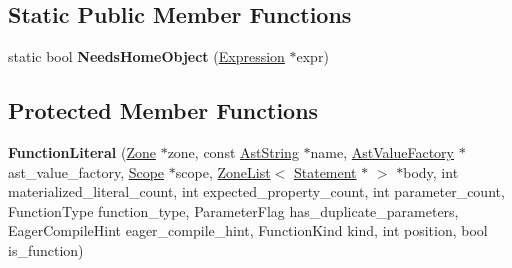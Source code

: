 \subsection*{Static Public Member Functions}
\begin{DoxyCompactItemize}
\item 
static bool {\bfseries Needs\+Home\+Object} (\hyperlink{classv8_1_1internal_1_1_expression}{Expression} $\ast$expr)\hypertarget{classv8_1_1internal_1_1_function_literal_ad78102843077c6fd61438c3709d6d1ba}{}\label{classv8_1_1internal_1_1_function_literal_ad78102843077c6fd61438c3709d6d1ba}

\end{DoxyCompactItemize}
\subsection*{Protected Member Functions}
\begin{DoxyCompactItemize}
\item 
{\bfseries Function\+Literal} (\hyperlink{classv8_1_1internal_1_1_zone}{Zone} $\ast$zone, const \hyperlink{classv8_1_1internal_1_1_ast_string}{Ast\+String} $\ast$name, \hyperlink{classv8_1_1internal_1_1_ast_value_factory}{Ast\+Value\+Factory} $\ast$ast\+\_\+value\+\_\+factory, \hyperlink{classv8_1_1internal_1_1_scope}{Scope} $\ast$scope, \hyperlink{classv8_1_1internal_1_1_zone_list}{Zone\+List}$<$ \hyperlink{classv8_1_1internal_1_1_statement}{Statement} $\ast$ $>$ $\ast$body, int materialized\+\_\+literal\+\_\+count, int expected\+\_\+property\+\_\+count, int parameter\+\_\+count, Function\+Type function\+\_\+type, Parameter\+Flag has\+\_\+duplicate\+\_\+parameters, Eager\+Compile\+Hint eager\+\_\+compile\+\_\+hint, Function\+Kind kind, int position, bool is\+\_\+function)\hypertarget{classv8_1_1internal_1_1_function_literal_a77b451785ce0483034a0229e0963dca9}{}\label{classv8_1_1internal_1_1_function_literal_a77b451785ce0483034a0229e0963dca9}

\end{DoxyCompactItemize}
